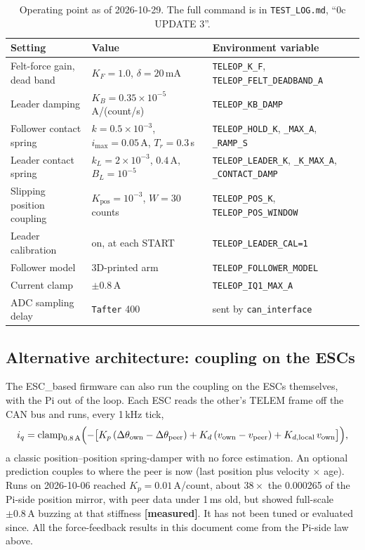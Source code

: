 \documentclass[11pt,a4paper]{article}
\newcommand{\iq}{i_q}
\newcommand{\mA}{\,\mathrm{mA}}
\newcommand{\A}{\,\mathrm{A}}
\newcommand{\file}[1]{\texttt{#1}}
\newcommand{\measured}{\textcolor{teal!70!black}{\textbf{[measured]}}}
\begin{document}
\begin{table}[h]
\centering
\small
\begin{tabular}{@{}>{\raggedright}p{3.6cm}>{\raggedright}p{5.4cm}>{\raggedright\arraybackslash}p{6.2cm}@{}}
\toprule
Setting & Value & Environment variable \\
\midrule
Felt-force gain, dead band & $K_F = 1.0$, $\delta = 20\mA$ & \texttt{TELEOP\_K\_F}, \texttt{TELEOP\_FELT\_DEADBAND\_A} \\
Leader damping & $K_B = 0.35\times10^{-5}$ A/(count/s) & \texttt{TELEOP\_KB\_DAMP} \\
Follower contact spring & $k=0.5\times10^{-3}$, $i_{\max}=0.05\A$, $T_r = 0.3$\,s & \texttt{TELEOP\_HOLD\_K}, \texttt{\_MAX\_A}, \texttt{\_RAMP\_S} \\
Leader contact spring & $k_L = 2\times10^{-3}$, $0.4\A$, $B_L = 10^{-5}$ & \texttt{TELEOP\_LEADER\_K}, \texttt{\_K\_MAX\_A}, \texttt{\_CONTACT\_DAMP} \\
Slipping position coupling & $K_{\mathrm{pos}} = 10^{-3}$, $W = 30$ counts & \texttt{TELEOP\_POS\_K}, \texttt{TELEOP\_POS\_WINDOW} \\
Leader calibration & on, at each START & \texttt{TELEOP\_LEADER\_CAL=1} \\
Follower model & 3D-printed arm & \texttt{TELEOP\_FOLLOWER\_MODEL} \\
Current clamp & $\pm 0.8\A$ & \texttt{TELEOP\_IQ1\_MAX\_A} \\
ADC sampling delay & \texttt{Tafter} 400 & sent by \file{can\_interface} \\
\bottomrule
\end{tabular}
\caption{Operating point as of 2026-10-29. The full command is in
\file{TEST\_LOG.md}, ``0c UPDATE 3''.}
\end{table}

\subsection{Alternative architecture: coupling on the ESCs}

The ESC\_based firmware can also run the coupling on the ESCs themselves,
with the Pi out of the loop. Each ESC reads the other's TELEM frame off the
CAN bus and runs, every 1\,kHz tick,
\begin{equation}
  \iq = \mathrm{clamp}_{0.8\A}\Bigl(-\bigl[K_p\,(\Delta\theta_{\mathrm{own}} - \Delta\theta_{\mathrm{peer}})
       + K_d\,(v_{\mathrm{own}} - v_{\mathrm{peer}}) + K_{d,\mathrm{local}}\,v_{\mathrm{own}}\bigr]\Bigr),
\end{equation}
a classic position--position spring-damper with no force estimation. An
optional prediction couples to where the peer is now (last position plus
velocity $\times$ age). Runs on 2026-10-06 reached $K_p = 0.01$\,A/count,
about $38\times$ the 0.000265 of the Pi-side position mirror, with peer
data under 1\,ms old, but showed full-scale $\pm0.8\A$ buzzing at that
stiffness \measured. It has not been tuned or evaluated since. All the
force-feedback results in this document come from the Pi-side law above.
\end{document}
